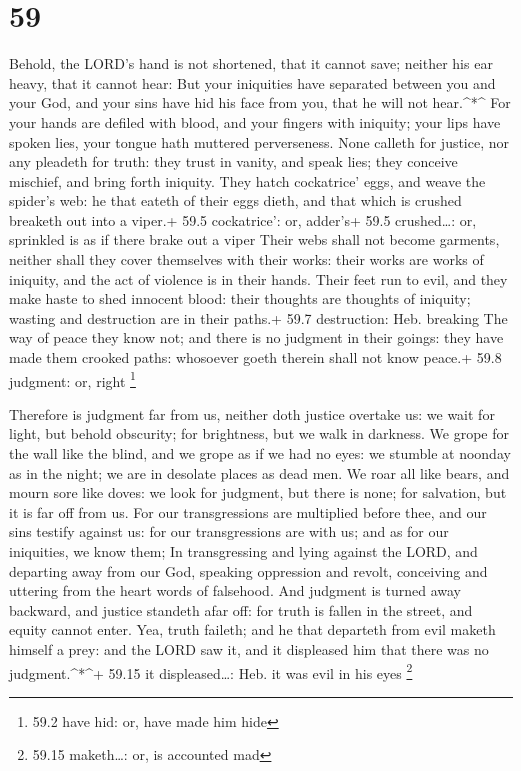 \hypertarget{section-58}{%
\section{59}\label{section-58}}

 Behold, the LORD's hand is not shortened, that it cannot
save; neither his ear heavy, that it cannot hear:  But your
iniquities have separated between you and your God, and your sins have
hid his face from you, that he will not hear.\^{}*\^{}  For
your hands are defiled with blood, and your fingers with iniquity; your
lips have spoken lies, your tongue hath muttered perverseness.
 None calleth for justice, nor any pleadeth for truth: they
trust in vanity, and speak lies; they conceive mischief, and bring forth
iniquity.  They hatch cockatrice' eggs, and weave the
spider's web: he that eateth of their eggs dieth, and that which is
crushed breaketh out into a viper.+ 59.5 cockatrice': or, adder's+ 59.5
crushed\ldots: or, sprinkled is as if there brake out a viper
 Their webs shall not become garments, neither shall they
cover themselves with their works: their works are works of iniquity,
and the act of violence is in their hands.  Their feet run
to evil, and they make haste to shed innocent blood: their thoughts are
thoughts of iniquity; wasting and destruction are in their paths.+ 59.7
destruction: Heb. breaking  The way of peace they know not;
and there is no judgment in their goings: they have made them crooked
paths: whosoever goeth therein shall not know peace.+ 59.8 judgment: or,
right \footnote{59.2 have hid: or, have made him hide}

 Therefore is judgment far from us, neither doth justice
overtake us: we wait for light, but behold obscurity; for brightness,
but we walk in darkness.  We grope for the wall like the
blind, and we grope as if we had no eyes: we stumble at noonday as in
the night; we are in desolate places as dead men.  We roar
all like bears, and mourn sore like doves: we look for judgment, but
there is none; for salvation, but it is far off from us. 
For our transgressions are multiplied before thee, and our sins testify
against us: for our transgressions are with us; and as for our
iniquities, we know them;  In transgressing and lying
against the LORD, and departing away from our God, speaking oppression
and revolt, conceiving and uttering from the heart words of falsehood.
 And judgment is turned away backward, and justice standeth
afar off: for truth is fallen in the street, and equity cannot enter.
 Yea, truth faileth; and he that departeth from evil maketh
himself a prey: and the LORD saw it, and it displeased him that there
was no judgment.\^{}*\^{}+ 59.15 it displeased\ldots: Heb. it was evil
in his eyes \footnote{59.15 maketh\ldots: or, is accounted mad}

